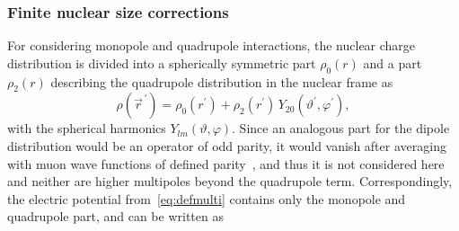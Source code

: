 \subsubsection{Finite nuclear size corrections}
\label{sec:radialEq}
For considering monopole and quadrupole interactions, the nuclear charge distribution is divided into a spherically symmetric part $\rho_0(r)$ and a part $\rho_2(r)$ describing the quadrupole distribution in the nuclear frame as~\cite{hitlin1970}
\begin{equation}
\label{eq:rho}
\rho(\vec{r}^{\,\prime}) = \rho_0(r^{\prime}) + \rho_2(r^{\prime}) \, Y_{20}(\vartheta^\prime,\varphi^\prime),
\end{equation}
with the spherical harmonics $Y_{lm}(\vartheta,\varphi)$. Since an analogous part for the dipole distribution would be an operator of odd parity, it would vanish after averaging with muon wave functions of defined parity~\cite{johnson2007}, and thus it is not considered here and neither are higher multipoles beyond the quadrupole term. Correspondingly, the electric potential from~\eqref{eq:defmulti} contains only the monopole and quadrupole part, and can be written as
